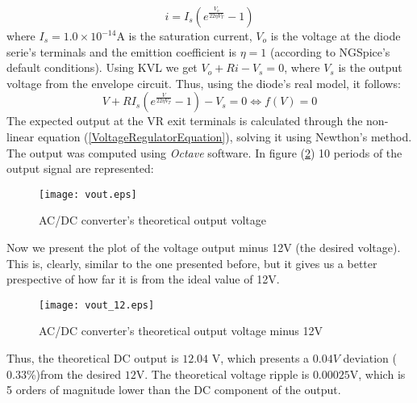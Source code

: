\begin{equation}
i=I_s(e^{\frac{V_o}{22 \eta V_T}}-1)
\end{equation}
where $I_s=1.0\times 10^{-14}$A is the saturation current, $V_o$ is the voltage at the diode serie's terminals and the emittion coefficient is $\eta=1$ (according to NGSpice's default conditions).
Using KVL we get $V_o+Ri-V_s=0$, where $V_s$ is the output voltage from the envelope circuit. Thus, using the diode's real model, it follows:
\begin{equation}
  V+RI_s(e^{\frac{V}{22 \eta V_T}}-1)-V_s=0 \Leftrightarrow f(V)=0
  \label{VoltageRegulatorEquation}
\end{equation}
The expected output at the VR exit terminals is calculated through the non-linear equation (\ref{VoltageRegulatorEquation}), solving it using Newthon's method.
The output was computed using \textit{Octave} software. In figure (\ref{fig:VoltageRegulatorOutput}) 10 periods of the output signal are represented:

 \begin{figure}[H]
   \centering
   \texttt{[image: vout.eps]}
   \caption{AC/DC converter's theoretical output voltage}
   \label{fig:VoltageRegulatorOutput}
 \end{figure}

Now we present the plot of the voltage output minus 12V (the desired voltage). This is, clearly, similar to the one presented before, but it gives us a better prespective of how far it is from the ideal value of 12V.
 \begin{figure}[H]
   \centering
   \texttt{[image: vout\_12.eps]}
   \caption{AC/DC converter's theoretical output voltage minus 12V}
   \label{fig:VoltageRegulatorOutput}
 \end{figure}



Thus, the theoretical DC output is $12.04$ V, which presents a $0.04V$ deviation ($0.33$\%)from the desired $12$V. The theoretical voltage ripple is $0.00025$V, which is 5 orders of magnitude lower than the DC component of the output.
